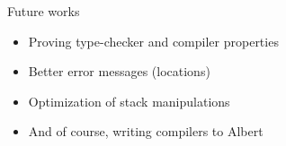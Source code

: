 \documentclass[aspectratio=169]{beamer}
\begin{document}
\begin{frame}{Future works}
  \begin{itemize}
  \item Proving type-checker and compiler properties
  \item Better error messages (locations)
  \item Optimization of stack manipulations
  \item And of course, writing compilers to Albert
  \end{itemize}
\end{frame}
\end{document}
